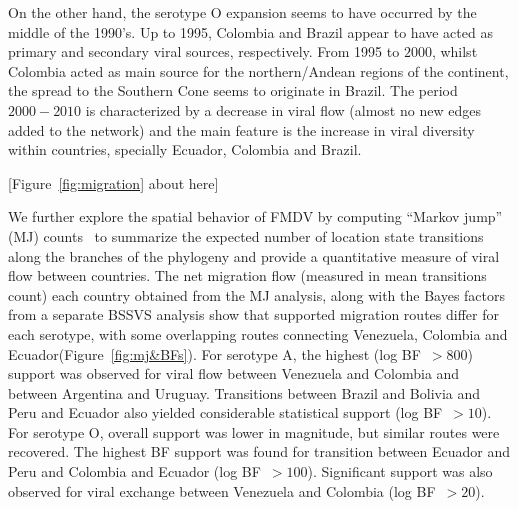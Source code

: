 \documentclass[10pt]{article}
\begin{document}
On the other hand, the serotype O expansion seems to have occurred by the middle of the 1990's.
Up to 1995, Colombia and Brazil appear to have acted as primary and secondary viral sources, respectively.
From 1995 to $2000$, whilst Colombia acted as main source for the northern/Andean regions of the continent, the spread to the Southern Cone seems to originate in Brazil.
The period $2000-2010$ is characterized by a decrease in viral flow (almost no new edges added to the network) and the main feature is the increase in viral diversity within countries, specially Ecuador, Colombia and Brazil.

\begin{center}
 [Figure~\ref{fig:migration} about here]
\end{center}

We further explore the spatial behavior of FMDV by  computing ``Markov jump'' (MJ) counts~\cite{Minin2008} to summarize the expected number of location state transitions along the branches of the phylogeny and provide a quantitative measure of viral flow between countries.
The net migration flow (measured in mean transitions count) each country obtained from the MJ analysis, along with the Bayes factors from a separate BSSVS analysis show that supported migration routes differ for each serotype, with some overlapping routes connecting Venezuela, Colombia and Ecuador(Figure~\ref{fig:mj&BFs}). 
For serotype A, the highest (log BF~$>800$) support was observed for viral flow between Venezuela and Colombia and between Argentina and Uruguay.
Transitions between Brazil and Bolivia and Peru and Ecuador also yielded considerable statistical support (log BF~$>10$).
For serotype O, overall support was lower in magnitude, but similar routes were recovered.
The highest BF support was found for transition between Ecuador and Peru and Colombia and Ecuador (log BF~$>100$).
Significant support was also observed for viral exchange between Venezuela and Colombia (log BF~$>20$). 
\end{document}
